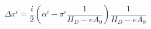\begin{equation}
\label{eq8}
\Delta x^i = \frac i2\left(\alpha^i-\pi^i\frac 1{H_D - eA_0}\right)\frac
1{H_D - eA_0}
\end{equation}

